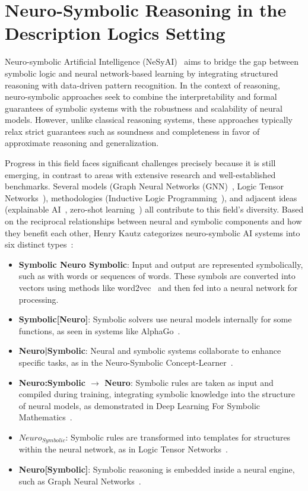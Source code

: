 \section{Neuro-Symbolic Reasoning in the Description Logics Setting}
\label{nesy}

Neuro-symbolic Artificial Intelligence (NeSyAI)~\cite{neuro_symbolic,neurosymbolic_AI} aims to bridge the gap between symbolic logic and neural network-based learning by integrating structured reasoning with data-driven pattern recognition. In the context of reasoning, neuro-symbolic approaches seek to combine the interpretability and formal guarantees of symbolic systems with the robustness and scalability of neural models. However, unlike classical reasoning systems, these approaches typically relax strict guarantees such as soundness and completeness in favor of approximate reasoning and generalization.

Progress in this field faces significant challenges precisely because it is still emerging, in contrast to areas with extensive research and well-established benchmarks. Several models (Graph Neural Networks (GNN)~\cite{GNN}, Logic Tensor Networks~\cite{LTN}), methodologies (Inductive Logic Programming~\cite{ILP}), and adjacent ideas (explainable AI~\cite{XAI}, zero-shot learning~\cite{zero-shot}) all contribute to this field's diversity. Based on the reciprocal relationships between neural and symbolic components and how they benefit each other, Henry Kautz categorizes neuro-symbolic AI systems into six distinct types~\cite{henry}:

\begin{itemize}
\item \textbf{Symbolic Neuro Symbolic}: Input and output are represented symbolically, such as with words or sequences of words. These symbols are converted into vectors using methods like word2vec~\cite{word2vec} and then fed into a neural network for processing.
\item \textbf{Symbolic[Neuro]}: Symbolic solvers use neural models internally for some functions, as seen in systems like AlphaGo~\cite{alphago}.
\item \textbf{Neuro|Symbolic}: Neural and symbolic systems collaborate to enhance specific tasks, as in the Neuro-Symbolic Concept-Learner~\cite{concept_learner}.
\item \textbf{Neuro:Symbolic $\rightarrow$ Neuro}: Symbolic rules are taken as input and compiled during training, integrating symbolic knowledge into the structure of neural models, as demonstrated in Deep Learning For Symbolic Mathematics~\cite{symbolicmaths}.
\item \textbf{$Neuro_{Symbolic}$}: Symbolic rules are transformed into templates for structures within the neural network, as in Logic Tensor Networks~\cite{logictensornetworks}.
\item \textbf{Neuro[Symbolic]}: Symbolic reasoning is embedded inside a neural engine, such as Graph Neural Networks~\cite{GNN}.
\end{itemize}

